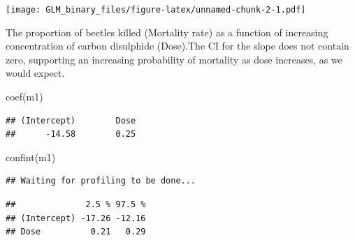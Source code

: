 \documentclass[
]{article}
\newenvironment{Shaded}{\begin{snugshade}}{\end{snugshade}}
\newcommand{\AttributeTok}[1]{\textcolor[rgb]{0.77,0.63,0.00}{#1}}
\newcommand{\FunctionTok}[1]{\textcolor[rgb]{0.00,0.00,0.00}{#1}}
\newcommand{\NormalTok}[1]{#1}
\newcommand{\SpecialCharTok}[1]{\textcolor[rgb]{0.00,0.00,0.00}{#1}}
\newcommand{\StringTok}[1]{\textcolor[rgb]{0.31,0.60,0.02}{#1}}
\begin{document}
\begin{Shaded}
\end{Shaded}

\texttt{[image: GLM\_binary\_files/figure-latex/unnamed-chunk-2-1.pdf]}

The proportion of beetles killed (Mortality rate) as a function of
increasing concentration of carbon disulphide (Dose).The CI for the
slope does not contain zero, supporting an increasing probability of
mortality as dose increases, as we would expect.

\begin{Shaded}
\begin{Highlighting}[]
\FunctionTok{coef}\NormalTok{(m1)}
\end{Highlighting}
\end{Shaded}

\begin{verbatim}
## (Intercept)        Dose 
##      -14.58        0.25
\end{verbatim}

\begin{Shaded}
\begin{Highlighting}[]
\FunctionTok{confint}\NormalTok{(m1)}
\end{Highlighting}
\end{Shaded}

\begin{verbatim}
## Waiting for profiling to be done...
\end{verbatim}

\begin{verbatim}
##              2.5 % 97.5 %
## (Intercept) -17.26 -12.16
## Dose          0.21   0.29
\end{verbatim}
\end{document}
